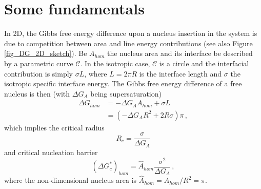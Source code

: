 %


\section{Some fundamentals}
In 2D, the Gibbs free energy difference upon a nucleus insertion in the system is due to competition between area and line energy contributions (see also Figure \ref{fig_DG_2D_sketch}). Be $A_{hom}$ the nucleus area and its interface be described by a parametric curve $\mathcal{C}$. In the isotropic case, $\mathcal{C}$ is a circle and the interfacial contribution is simply $\sigma L$, where $L=2\pi R$ is the interface length and $\sigma$ the isotropic specific interface energy. The Gibbs free energy difference of a free nucleus is then (with $\Delta G_A$ being supersaturation)
\begin{align}
	\Delta G_{hom} &= -\Delta G_A A_{hom} + \sigma L \\
	\label{eq_DG_hom_iso}	&= (-\Delta G_A R^2 + 2R\sigma)\pi \,,
\end{align}
which implies the critical radius
\begin{equation} \label{eq_crit_radius_2D}
	R_c = \frac{\sigma}{\Delta G_A}
\end{equation}
and critical nucleation barrier
\begin{equation} \label{eq_nucl_barr_hom_2D}
	(\Delta G_c^*)_{hom} = \hat{A}_{hom}\frac{\sigma^2}{\Delta G_A}\,,
\end{equation}
where the non-dimensional nucleus area is $\hat{A}_{hom}=A_{hom}/R^2=\pi$.

